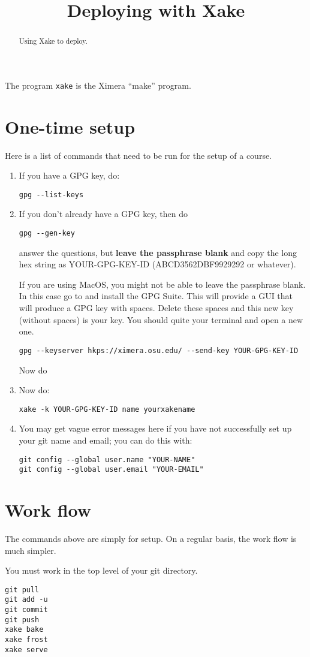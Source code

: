 \documentclass{ximera}
\title{Deploying with Xake}
\begin{document}
\begin{abstract}
Using Xake to deploy.
\end{abstract}
\maketitle

The program \verb|xake| is the Ximera ``make'' program.

\section{One-time setup}

Here is a list of commands that need to be run for the setup of a course. 

\begin{enumerate}
\item If you have a GPG key, do:
\begin{verbatim}
gpg --list-keys
\end{verbatim}
\item If you don’t already have a GPG key, then do
\begin{verbatim}
gpg --gen-key
\end{verbatim}
answer the questions, but \textbf{leave the passphrase blank} and copy
the long hex string as YOUR-GPG-KEY-ID (ABCD3562DBF9929292 or
whatever).

If you are using MacOS, you might not be able to leave the passphrase
blank. In this case go to  and install the
GPG Suite.  This will provide a GUI that will produce a GPG key with
spaces. Delete these spaces and this new key (without spaces) is your
key. You should quite your terminal and open a new one.

\begin{verbatim}
gpg --keyserver hkps://ximera.osu.edu/ --send-key YOUR-GPG-KEY-ID
\end{verbatim}
Now do
\item Now do: 
\begin{verbatim}
xake -k YOUR-GPG-KEY-ID name yourxakename
\end{verbatim}

\item You may get vague error messages here if you have not successfully set up your git name and email; you can do this with:
\begin{verbatim}
git config --global user.name "YOUR-NAME"
git config --global user.email "YOUR-EMAIL"
\end{verbatim}
\end{enumerate}


\section{Work flow}

The commands above are simply for setup. On a regular basis, the work flow is much simpler.

You must work in the top level of your git directory.
\begin{verbatim}
git pull
git add -u
git commit
git push
xake bake
xake frost
xake serve
\end{verbatim}




  
\end{document}
